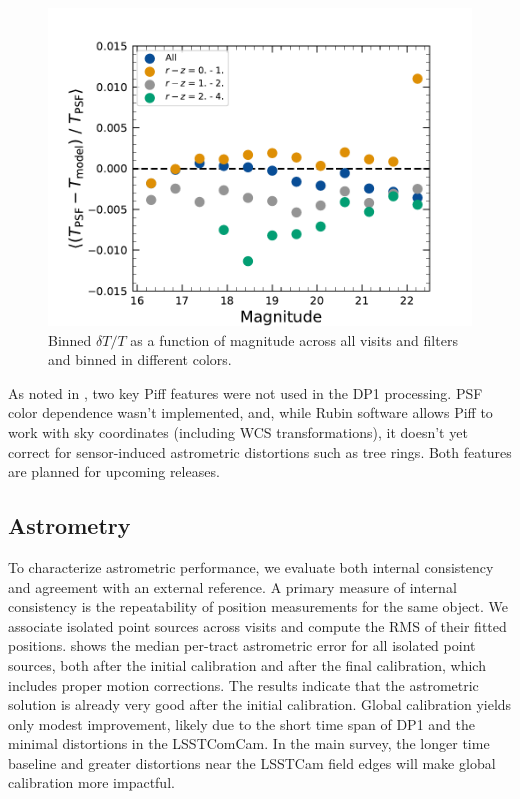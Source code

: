 \begin{figure}[htb!]
\centering
\includegraphics[width=0.98\linewidth]{dT_T_Piff_poly_4_vs_mag.pdf}
\caption{Binned $\delta T/T$ as a function of magnitude across
all visits and filters and binned in different colors.}
\label{fig:psf_residuals_mag_color}
\vspace{0.1cm}
\end{figure}

As noted in  \cite{PSTN-019}, two key Piff features were not used in the DP1 processing.
PSF color dependence wasn’t implemented, and, while Rubin software allows Piff to work with sky coordinates (including WCS transformations), it doesn’t yet correct for sensor-induced astrometric distortions such as tree rings.
Both features are planned for upcoming releases.


\subsection{Astrometry}
To characterize astrometric performance, we evaluate both internal consistency and agreement with an external reference.
A primary measure of internal consistency is the repeatability of position measurements for the same object. We associate isolated point sources across visits and compute the \gls{RMS} of their fitted positions.
 shows the median per-\gls{tract} astrometric error for all isolated point sources, both after the initial calibration and after the final calibration, which includes proper motion corrections.
The results indicate that the astrometric solution is already very good after the initial \gls{calibration}.
Global calibration yields only modest improvement, likely due to the short time span of \gls{DP1} and the minimal distortions in the LSSTComCam.
In the main survey, the longer time baseline and greater distortions near the \gls{LSSTCam} field edges will make global calibration more impactful.

